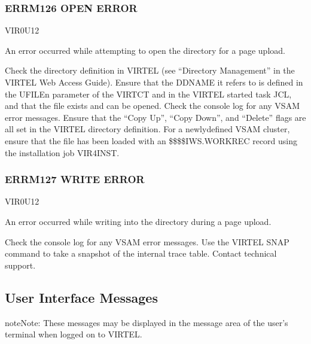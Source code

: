 \documentclass[letterpaper,10pt,english]{sphinxmanual}
\begin{document}
\subsubsection{ERRM126 \sphinxhyphen{} OPEN ERROR}
\label{\detokenize{messages:errm126-open-error}}\begin{description}
\sphinxAtStartPar
VIR0U12

\sphinxAtStartPar
An error occurred while attempting to open the directory for a page upload.

\sphinxAtStartPar
Check the directory definition in VIRTEL (see “Directory Management” in the VIRTEL Web Access Guide). Ensure that the DDNAME it refers to is defined in the UFILEn parameter of the VIRTCT and in the VIRTEL started task JCL, and that the file exists and can be opened. Check the console log for any VSAM error messages. Ensure that the “Copy Up”, “Copy Down”, and “Delete” flags are all set in the VIRTEL directory definition. For a newly\sphinxhyphen{}defined VSAM cluster, ensure that the file has been loaded with an \$\$\$\$IWS.WORKREC record using the installation job VIR4INST.

\end{description}


\subsubsection{ERRM127 \sphinxhyphen{} WRITE ERROR}
\label{\detokenize{messages:errm127-write-error}}\begin{description}
\sphinxAtStartPar
VIR0U12

\sphinxAtStartPar
An error occurred while writing into the directory during a page upload.

\sphinxAtStartPar
Check the console log for any VSAM error messages. Use the VIRTEL SNAP command to take a snapshot of the internal trace table. Contact technical support.

\end{description}


\subsection{User Interface Messages}
\label{\detokenize{messages:user-interface-messages}}
\begin{sphinxadmonition}{note}{Note:}
\sphinxAtStartPar
These messages may be displayed in the message area of the user’s terminal when logged on to VIRTEL.
\end{sphinxadmonition}
\end{document}
